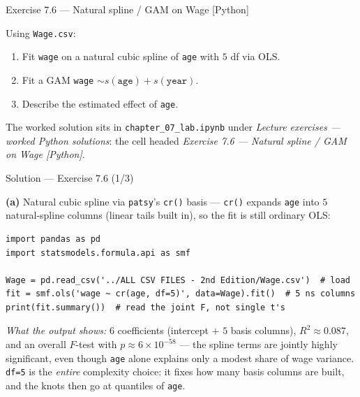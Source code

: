 \documentclass[aspectratio=169,11pt]{beamer}
\begin{document}
\begin{frame}[fragile]{Exercise 7.6 --- Natural spline / GAM on Wage [Python]}
\begin{exercise}
Using \texttt{Wage.csv}:
\begin{enumerate}
  \item Fit \texttt{wage} on a natural cubic spline of \texttt{age} with $5$ df via OLS.
  \item Fit a GAM \texttt{wage} $\sim s(\texttt{age})+s(\texttt{year})$.
  \item Describe the estimated effect of \texttt{age}.
\end{enumerate}
\end{exercise}
\begin{labnote}
  The worked solution sits in \texttt{chapter\_07\_lab.ipynb} under \emph{Lecture exercises --- worked Python solutions}: the cell headed \emph{Exercise 7.6 --- Natural spline / GAM on Wage [Python]}.
\end{labnote}
\end{frame}

\begin{frame}[fragile]{Solution --- Exercise 7.6 (1/3)}
\begin{solutionbox}
\textbf{(a)} Natural cubic spline via \texttt{patsy}'s \texttt{cr()} basis --- \texttt{cr()} expands \texttt{age} into $5$ natural-spline columns (linear tails built in), so the fit is still ordinary OLS:
\begin{lstlisting}
import pandas as pd
import statsmodels.formula.api as smf

Wage = pd.read_csv('../ALL CSV FILES - 2nd Edition/Wage.csv')  # load
fit = smf.ols('wage ~ cr(age, df=5)', data=Wage).fit()  # 5 ns columns
print(fit.summary())  # read the joint F, not single t's
\end{lstlisting}
\emph{What the output shows:} $6$ coefficients (intercept $+$ $5$ basis columns), $R^2\approx0.087$, and an overall $F$-test with $p\approx6\times10^{-58}$ --- the spline terms are jointly highly significant, even though \texttt{age} alone explains only a modest share of wage variance. \texttt{df=5} is the \emph{entire} complexity choice: it fixes how many basis columns are built, and the knots then go at quantiles of \texttt{age}.
\end{solutionbox}
\end{frame}
\end{document}
